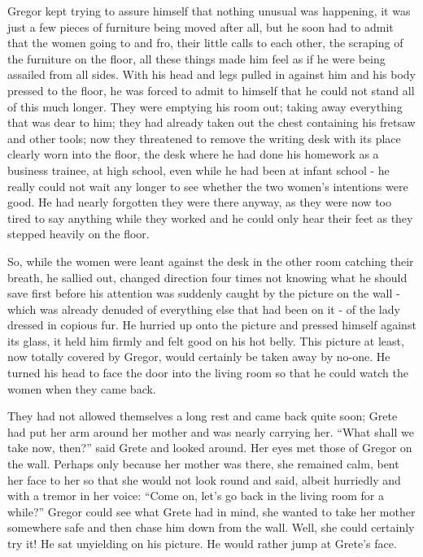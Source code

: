 \documentclass[12pt]{report}
\begin{document}
Gregor kept trying to assure himself that nothing unusual was happening,
it was just a few pieces of furniture being moved after all, but he soon
had to admit that the women going to and fro, their little calls to each
other, the scraping of the furniture on the floor, all these things made
him feel as if he were being assailed from all sides. With his head and
legs pulled in against him and his body pressed to the floor, he was
forced to admit to himself that he could not stand all of this much
longer. They were emptying his room out; taking away everything that was
dear to him; they had already taken out the chest containing his fretsaw
and other tools; now they threatened to remove the writing desk with its
place clearly worn into the floor, the desk where he had done his
homework as a business trainee, at high school, even while he had been
at infant school - he really could not wait any longer to see whether
the two women's intentions were good. He had nearly forgotten they were
there anyway, as they were now too tired to say anything while they
worked and he could only hear their feet as they stepped heavily on the
floor.

So, while the women were leant against the desk in the other room
catching their breath, he sallied out, changed direction four times not
knowing what he should save first before his attention was suddenly
caught by the picture on the wall - which was already denuded of
everything else that had been on it - of the lady dressed in copious
fur. He hurried up onto the picture and pressed himself against its
glass, it held him firmly and felt good on his hot belly. This picture
at least, now totally covered by Gregor, would certainly be taken away
by no-one. He turned his head to face the door into the living room so
that he could watch the women when they came back.

They had not allowed themselves a long rest and came back quite soon;
Grete had put her arm around her mother and was nearly carrying her.
``What shall we take now, then?'' said Grete and looked around. Her
eyes met those of Gregor on the wall. Perhaps only because her mother
was there, she remained calm, bent her face to her so that she would not
look round and said, albeit hurriedly and with a tremor in her voice:
``Come on, let's go back in the living room for a while?'' Gregor could
see what Grete had in mind, she wanted to take her mother somewhere safe
and then chase him down from the wall. Well, she could certainly try it!
He sat unyielding on his picture. He would rather jump at Grete's face.
\end{document}
